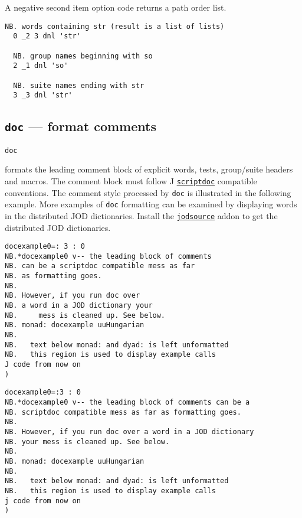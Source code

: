   A negative second item option code returns a path order list.

\begin{lstlisting}[frame=single,framerule=0pt] 
  NB. words containing str (result is a list of lists)
  0 _2 3 dnl 'str' 
  
  NB. group names beginning with so
  2 _1 dnl 'so'   
  
  NB. suite names ending with str 
  3 _3 dnl 'str'   
\end{lstlisting}

\subsection{\texttt{doc} --- format comments}\label{ss:doc}

\hypertarget{il:doc}{\texttt{doc}} formats the leading comment block 
of explicit words, tests, group/suite headers and macros.  The comment block must follow J
\href{http://www.jsoftware.com/help/user/scriptdoc.htm}{\texttt{scriptdoc}}
 \cite{scriptdoc} compatible conventions.  The comment style processed by \texttt{doc} is 
illustrated in the following example. More examples of \texttt{doc} 
formatting can be examined by displaying 
words in the distributed JOD dictionaries. 
Install the \href{http://www.jsoftware.com/jwiki/Addons/general/jodsource}{\texttt{jodsource}} 
addon to get the distributed JOD dictionaries.

\begin{lstlisting}[frame=single,framerule=0pt]
docexample0=: 3 : 0
NB.*docexample0 v-- the leading block of comments
NB. can be a scriptdoc compatible mess as far
NB. as formatting goes.
NB.
NB. However, if you run doc over
NB. a word in a JOD dictionary your 
NB.     mess is cleaned up. See below.
NB. monad: docexample uuHungarian
NB.
NB.   text below monad: and dyad: is left unformatted
NB.   this region is used to display example calls
J code from now on
) 
\end{lstlisting}

\begin{lstlisting}[frame=single,framerule=0pt]
docexample0=:3 : 0
NB.*docexample0 v-- the leading block of comments can be a
NB. scriptdoc compatible mess as far as formatting goes.
NB.
NB. However, if you run doc over a word in a JOD dictionary
NB. your mess is cleaned up. See below.
NB.
NB. monad: docexample uuHungarian
NB.
NB.   text below monad: and dyad: is left unformatted
NB.   this region is used to display example calls
j code from now on
) 
\end{lstlisting}

